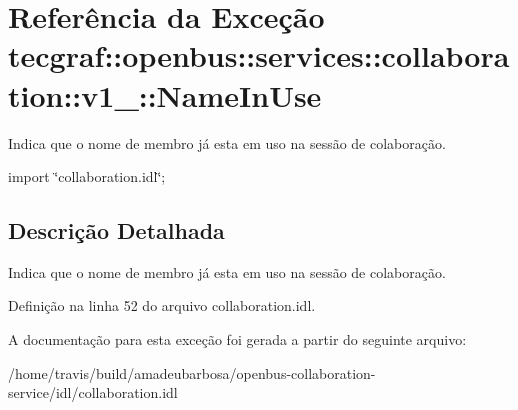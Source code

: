 \hypertarget{exceptiontecgraf_1_1openbus_1_1services_1_1collaboration_1_1v1__0_1_1NameInUse}{\section{\-Referência da \-Exceção tecgraf\-:\-:openbus\-:\-:services\-:\-:collaboration\-:\-:v1\-\_\-:\-:\-Name\-In\-Use}
\label{exceptiontecgraf_1_1openbus_1_1services_1_1collaboration_1_1v1__0_1_1NameInUse}
}


\-Indica que o nome de membro já esta em uso na sessão de colaboração.  




{\ttfamily import \char`\"{}collaboration.\-idl\char`\"{};}



\subsection{\-Descrição \-Detalhada}
\-Indica que o nome de membro já esta em uso na sessão de colaboração. 

\-Definição na linha 52 do arquivo collaboration.\-idl.



\-A documentação para esta exceção foi gerada a partir do seguinte arquivo\-:\begin{DoxyCompactItemize}
\item 
/home/travis/build/amadeubarbosa/openbus-\/collaboration-\/service/idl/collaboration.\-idl\end{DoxyCompactItemize}
